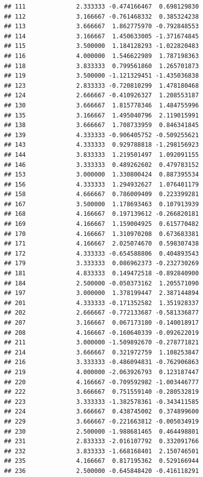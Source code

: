 \documentclass[
]{article}
\begin{document}
\begin{verbatim}
## 111              2.333333 -0.474166467  0.698129830
## 112              3.166667 -0.761468332  0.385324238
## 113              3.666667  1.862775970 -0.792848553
## 114              3.166667  1.450633005 -1.371674845
## 115              3.500000  1.184128293 -1.022820483
## 116              4.000000  1.546622989  1.787198363
## 118              3.833333  0.799561860  1.265701873
## 119              3.500000 -1.121329451 -1.435036838
## 123              2.833333 -0.720810299  1.478180468
## 124              2.666667 -0.410926327  1.208553187
## 130              3.666667  1.815778346  1.484755996
## 135              3.166667  1.495040796  2.119015991
## 138              3.666667  1.708733959  0.846341845
## 139              4.333333 -0.906405752 -0.509255621
## 143              4.333333  0.929788818 -1.298156923
## 144              3.833333  1.219501497  1.092091155
## 146              3.333333  0.489262602  0.479783152
## 153              3.000000  1.330800424  0.887395534
## 156              4.333333  1.294932627  1.076401179
## 158              4.666667  0.786009409  0.223399281
## 167              3.500000  1.178693463  0.107913939
## 168              4.166667  0.197139612 -0.266820181
## 169              4.166667  1.159004925  0.615770482
## 170              4.166667  1.310970208  0.673683381
## 171              4.166667  2.025074670  0.598307438
## 172              4.333333 -0.654588806  0.404893543
## 179              3.333333  0.086962373 -0.232730269
## 181              4.833333  0.149472518 -0.892840900
## 184              2.500000 -0.050373162  1.205571090
## 197              3.000000  1.378199447  2.387144894
## 201              4.333333 -0.171352582  1.351928337
## 202              2.666667 -0.772133687 -0.581336877
## 207              3.166667  0.067173180 -0.140018917
## 208              4.166667 -0.160640339 -0.092622019
## 211              3.000000 -1.509892670 -0.278771821
## 214              3.666667  0.321972759  1.108253847
## 216              3.333333 -0.486094831 -0.762906863
## 219              4.000000 -2.063926793  0.123187447
## 220              4.166667 -0.709592982 -1.003446777
## 222              3.666667  0.751559140 -0.280532819
## 223              3.333333 -1.382578361 -0.343411585
## 224              3.666667  0.438745002  0.374899600
## 229              3.666667 -0.221663812 -0.005034919
## 230              2.500000 -1.988681465  0.464498801
## 231              2.833333 -2.016107792  0.332091766
## 232              3.833333 -1.668168401  2.150746501
## 235              4.166667  0.817195362  0.529166944
## 236              2.500000 -0.645848420 -0.416118291

\end{verbatim}
\end{document}
